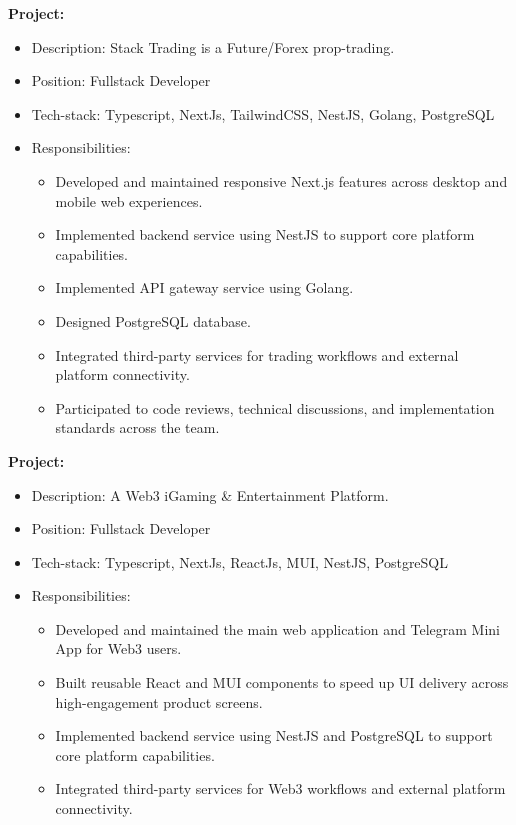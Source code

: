 \documentclass[a4paper, 11pt]{article}
\newcommand{\projectHeading}[1]{%
\textbf{Project:} \text{#1}%
\vspace{-3.0mm}%
}
\newcommand{\responsibilities}{%
\item{Responsibilities:}%
\begin{itemize}[leftmargin=6ex,noitemsep,labelsep=1mm,itemsep=0mm,label={·}]\small%
}
\newcommand{\responsibilitiesEnd}{\end{itemize}}
\newcommand{\resumeItemListStart}{\begin{justify}\begin{itemize}[leftmargin=3ex,
rightmargin=2ex, noitemsep,labelsep=1.2mm,itemsep=0mm]\small}
\newcommand{\resumeItemListEnd}{\end{itemize}\end{justify}
\vspace{-2mm}}
\begin{document}
\projectHeading{StackTrading}
\resumeItemListStart
\item {Description: Stack Trading is a Future/Forex prop-trading.}
\item {Position: Fullstack Developer}
\item {Tech-stack: Typescript, NextJs, TailwindCSS, NestJS, Golang, PostgreSQL}
\responsibilities
\item {Developed and maintained responsive Next.js features across desktop and mobile web experiences.}
\item {Implemented backend service using NestJS to support core platform capabilities.}
\item {Implemented API gateway service using Golang.}
\item {Designed PostgreSQL database.}
\item {Integrated third-party services for trading workflows and external platform connectivity.}
\item {Participated to code reviews, technical discussions, and implementation standards across the team.}
\responsibilitiesEnd
\resumeItemListEnd


\projectHeading{Mint}
\resumeItemListStart
\item {Description: A Web3 iGaming \& Entertainment Platform.}
\item {Position: Fullstack Developer}
\item {Tech-stack: Typescript, NextJs, ReactJs, MUI, NestJS, PostgreSQL}
\responsibilities
\item {Developed and maintained the main web application and Telegram Mini App for Web3 users.}
\item {Built reusable React and MUI components to speed up UI delivery across high-engagement product screens.}
\item {Implemented backend service using NestJS and PostgreSQL to support core platform capabilities.}
\item {Integrated third-party services for Web3 workflows and external platform connectivity.}
\responsibilitiesEnd
\resumeItemListEnd
\vspace{3.0mm}
\end{document}
